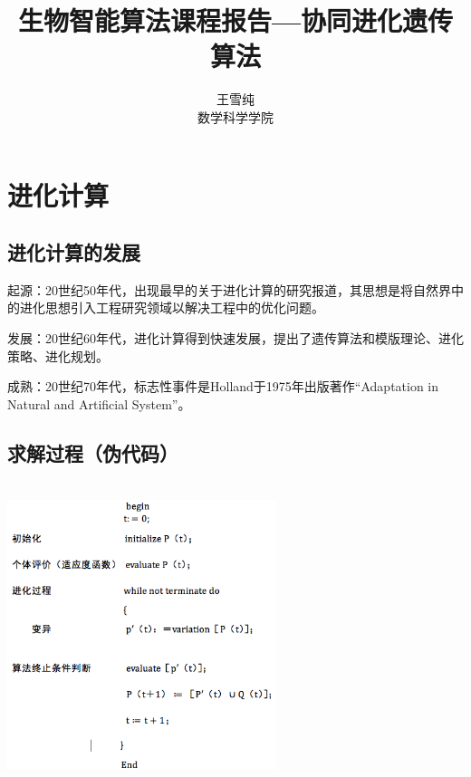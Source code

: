 \documentclass[8pt]{article}
\begin{document}
  
\title{生物智能算法课程报告—协同进化遗传算法 }  
\author { 王雪纯\\数学科学学院}  
\maketitle    
\section{进化计算}  
\vspace{0.1cm}  
\subsection{进化计算的发展}
\begin{description}
        	\item 起源：20世纪50年代，出现最早的关于进化计算的研究报道，其思想是将自然界中的进化思想引入工程研究领域以解决工程中的优化问题。
	\item 发展：20世纪60年代，进化计算得到快速发展，提出了遗传算法和模版理论、进化策略、进化规划。
	\item 成熟：20世纪70年代，标志性事件是Holland于1975年出版著作“Adaptation in Natural and Artificial System”。
	\end{description}
	
\subsection{求解过程（伪代码）}\\
\includegraphics[width=0.59\textwidth]{0.png}
\end{document}
